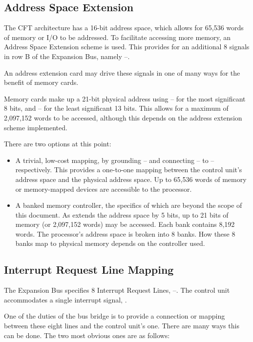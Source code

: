 \subsection{Address Space Extension}

The CFT architecture has a 16-bit address space, which allows for
65,536 words of memory or I/O to be addressed. To facilitate accessing
more memory, an Address Space Extension scheme is used. This provides
for an additional 8 signals in row B of the Expansion Bus, namely
–.

An address extension card may drive these signals in one of many ways
for the benefit of memory cards.

Memory cards make up a 21-bit physical address using
– for the most significant 8 bits, and
– for the least significant 13 bits. This allows
for a maximum of 2,097,152 words to be accessed, although this depends
on the address extension scheme implemented.

There are two options at this point:

\begin{itemize}
\item A trivial, low-cost mapping, by grounding –
  and connecting – to –
  respectively. This provides a one-to-one mapping between the control
  unit's address space and the physical address space. Up to 65,536
  words of memory or memory-mapped devices are accessible to the
  processor.
\item A banked memory controller, the specifics of which are beyond
  the scope of this document. As \AEXTn{} extends the address space by
  5 bits, up to 21 bits of memory (or 2,097,152 words) may be
  accessed. Each bank contains 8,192 words. The processor's address
  space is broken into 8 banks. How these 8 banks map to physical
  memory depends on the controller used.
\end{itemize}

\subsection{Interrupt Request Line Mapping}

The Expansion Bus specifies 8 Interrupt Request Lines,
–. The control unit accommodates a single interrupt
signal, \IRQ.

One of the duties of the bus bridge is to provide a connection or
mapping between these eight lines and the control unit's one. There
are many ways this can be done. The two most obvious ones are as follows:

